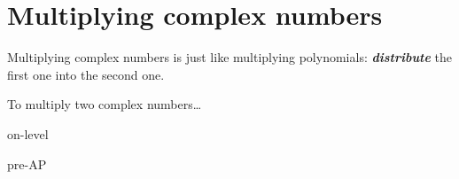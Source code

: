 
\section*{Multiplying complex numbers}

Multiplying complex numbers is just like multiplying polynomials:
{\bfseries\itshape distribute} the first one into the second one.

\begin{myConceptSteps}{
    To multiply two complex numbers\dots
    }
\end{myConceptSteps}




\begin{taggedblock}{on-level}
\end{taggedblock}




\begin{taggedblock}{pre-AP}
\end{taggedblock}
    